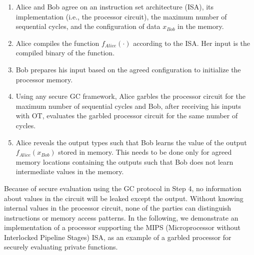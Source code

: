 \begin{enumerate}
\item
  Alice and Bob agree on an instruction set architecture (ISA), its implementation (i.e., the processor circuit), the maximum number of sequential cycles, and the configuration of data $x_{Bob}$ in the memory.
\item
  Alice compiles the function $f_{Alice}(\cdot)$ according to the ISA.
  Her input is the compiled binary of the function.
\item
  Bob prepares his input based on the agreed configuration to initialize the processor memory.
\item
  Using any secure GC framework, Alice garbles the processor circuit for the maximum number of sequential cycles and Bob, after receiving his inputs with OT, evaluates the garbled processor circuit for the same number of cycles.

\item
  Alice reveals the output types such that Bob learns the value of the output $f_{Alice}(x_{Bob})$ stored in memory.
  This needs to be done only for agreed memory locations containing the outputs such that Bob does not learn intermediate values in the memory.
\end{enumerate}

Because of secure evaluation using the GC protocol in Step 4, no information about values in the circuit will be leaked except the output.
Without knowing internal values in the processor circuit, none of the parties can distinguish instructions or memory access patterns.
In the following, we demonstrate an implementation of a processor supporting the MIPS (Microprocessor without Interlocked Pipeline Stages) ISA, as an example of a garbled processor for securely evaluating private functions.

